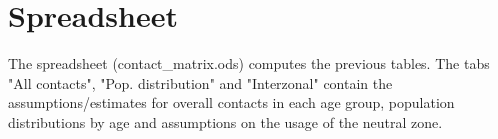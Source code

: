 \documentclass{article}
\begin{document}
\section{Spreadsheet}

The spreadsheet (contact\_matrix.ods) computes the previous tables. The tabs
"All contacts", "Pop. distribution" and "Interzonal" contain the
assumptions/estimates for overall contacts in each age group, population
distributions by age and assumptions on the usage of the neutral zone.
\end{document}
